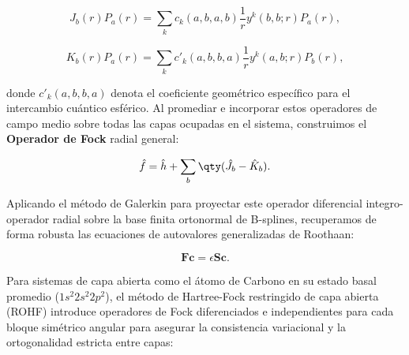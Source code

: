 \begin{equation}
  J_b(r) P_a(r) = \sum_k c_k(a,b,a,b) \frac{1}{r} y^k(b,b; r) P_a(r),
\end{equation}

\begin{equation}
  K_b(r) P_a(r) = \sum_k c'_k(a,b,b,a) \frac{1}{r} y^k(a,b; r) P_b(r),
\end{equation}

donde \( c'_k(a,b,b,a) \) denota el coeficiente geométrico específico para el intercambio cuántico esférico. Al promediar e incorporar estos operadores de campo medio sobre todas las capas ocupadas en el sistema, construimos el \textbf{Operador de Fock} radial general:

\begin{equation}
  \hat{f} = \hat{h} + \sum_b \qty( \hat{J}_b - \hat{K}_b ).
\end{equation}

Aplicando el método de Galerkin para proyectar este operador diferencial integro-operador radial sobre la base finita ortonormal de B-splines, recuperamos de forma robusta las ecuaciones de autovalores generalizadas de Roothaan:

\begin{equation}
  \bm{F}\bm{c} = \epsilon\bm{S}\bm{c}.
\end{equation}

Para sistemas de capa abierta como el átomo de Carbono en su estado basal promedio (\( 1s^2 2s^2 2p^2 \)), el método de Hartree-Fock restringido de capa abierta (ROHF) introduce operadores de Fock diferenciados e independientes para cada bloque simétrico angular para asegurar la consistencia variacional y la ortogonalidad estricta entre capas:

